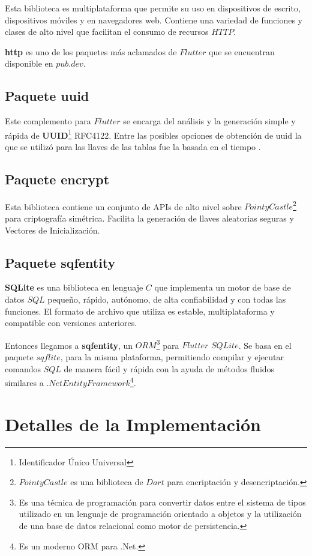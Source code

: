 Esta biblioteca es multiplataforma que permite su uso en dispositivos de escrito, dispositivos móviles y en navegadores web. Contiene una variedad de funciones y clases de alto nivel que facilitan el consumo de recursos $HTTP$. 

\textbf{http}  es uno de los paquetes más aclamados de $Flutter$ que se encuentran disponible en $pub.dev$.

\subsection{Paquete uuid}
Este complemento para $Flutter$ se encarga del análisis y la generación simple y rápida de \textbf{UUID}\footnote{Identificador Único Universal}  RFC4122. Entre las posibles opciones de obtención de uuid la que se utilizó para las llaves de las tablas fue la basada en el tiempo . 


\subsection{Paquete encrypt}
Esta biblioteca contiene un conjunto de APIs de alto nivel sobre $PointyCastle$\footnote{$PointyCastle$ es una biblioteca de $Dart$ para encriptación y desencriptación.} para criptografía simétrica. Facilita la generación de llaves aleatorias seguras y Vectores de Inicialización.


\subsection{Paquete sqfentity}
\textbf{SQLite} es una biblioteca en lenguaje $C$ que implementa un motor de base de datos $SQL$ pequeño, rápido, autónomo, de alta confiabilidad y con todas las funciones. El formato de archivo que utiliza es estable, multiplataforma y compatible con versiones anteriores.
 
Entonces llegamos a \textbf{sqfentity}, un $ORM$\footnote{Es una técnica de programación para convertir datos entre el sistema de tipos utilizado en un lenguaje de programación orientado a objetos y la utilización de una base de datos relacional como motor de persistencia.}  para $Flutter$ $SQLite$. Se basa en el paquete $sqflite$, para la misma plataforma, permitiendo compilar y ejecutar comandos $SQL$ de manera fácil y rápida con la ayuda de métodos fluidos similares a $.Net Entity Framework$\footnote{Es un moderno ORM para .Net.}.

\section{Detalles de la Implementación}
\label{chapter:implementation}

